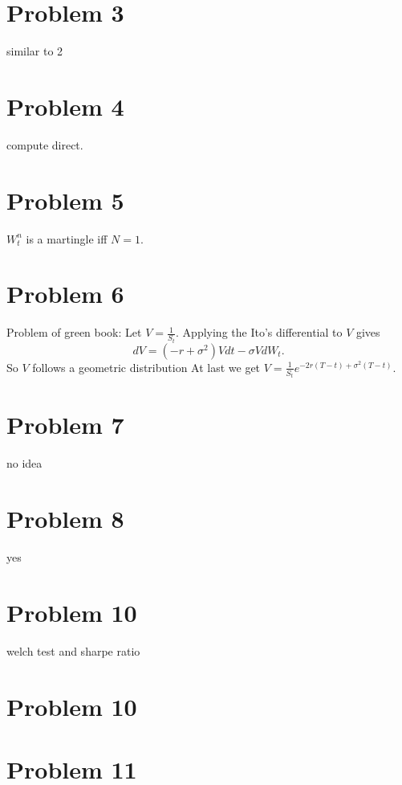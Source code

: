 \documentclass[12pt]{amsart}
\begin{document}
\section{Problem 3}
similar to 2

\section{Problem 4}
compute direct.


\section{Problem 5}
$W_t^n$ is a martingle iff $N=1$. 


\section{Problem 6}
Problem of green book: Let $V=\frac{1}{S_t}$. Applying the Ito's differential to $V$ gives 
$$dV=(-r+\sigma^2)Vdt-\sigma VdW_t.$$ So $V$ follows a geometric distribution At last we get $V=\frac{1}{S_t}e^{-2r(T-t)+\sigma^2(T-t)}$.


\section{Problem 7}
no idea

\section{Problem 8}
yes

\section{Problem 10}
welch test and sharpe ratio

\section{Problem 10}

\begin{framed}

\end{framed}

\section{Problem 11}

\begin{framed}

\end{framed}
\end{document}
